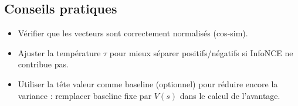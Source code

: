 \documentclass[a4paper,11pt]{article}
\begin{document}
\subsection*{Conseils pratiques}
\begin{itemize}
  \item Vérifier que les vecteurs sont correctement normalisés (cos-sim). 
  \item Ajuster la température $\tau$ pour mieux séparer positifs/négatifs si InfoNCE ne contribue pas. 
  \item Utiliser la tête valeur comme baseline (optionnel) pour réduire encore la variance : remplacer baseline fixe par $V(s)$ dans le calcul de l'avantage. 
\end{itemize}
\end{document}
